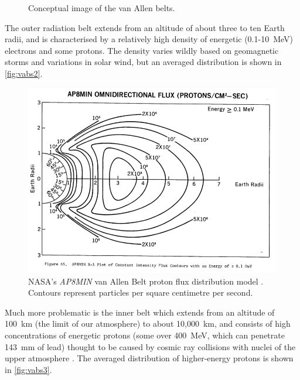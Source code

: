 \begin{figure}
\centering
\def\svgwidth{\figurewidth}

\caption{Conceptual image of the van Allen belts.} \label{fig:vabs}
\end{figure}

The outer radiation belt extends from an altitude of about three to ten Earth radii, and is characterised by a relatively high density of energetic (0.1-10~MeV) electrons and some protons. The density varies wildly based on geomagnetic storms and variations in solar wind, but an averaged distribution is shown in \autoref{fig:vabs2}.


\begin{figure} 
\includegraphics[width=\textwidth,clip,trim=0 35 0 30]{Images/800px-Ap8-omni-0_100MeV.png}
\caption{NASA's \emph{AP8MIN} van Allen Belt proton flux distribution model \parencite{Sawyer1976}. Contours represent particles per square centimetre per second.} \label{fig:vabs2}
\end{figure}

Much more problematic is the inner belt which extends from an altitude of 100~km (the limit of our atmosphere) to about 10,000~km, and consists of high concentrations of energetic protons (some over 400~MeV, which can penetrate 143~mm of lead) thought to be caused by cosmic ray collisions with nuclei of the upper atmosphere \parencite{Hess1968}. The averaged distribution of higher-energy protons is shown in \autoref{fig:vabs3}.

